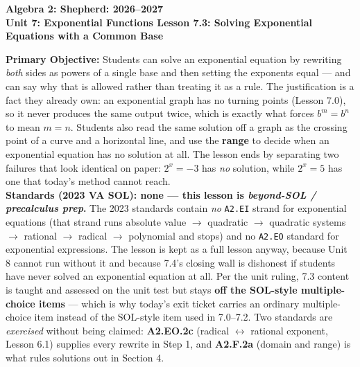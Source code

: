 \documentclass[10pt]{article}
\newcommand{\CourseName}{Algebra 2: Shepherd}
\newcommand{\SchoolYear}{2026--2027}
\newcommand{\UnitNumberName}{Unit 7: Exponential Functions \quad}
\newcommand{\LessonNumberName}{Lesson 7.3: Solving Exponential Equations with a Common Base}
\begin{document}
\begin{center}
    {\Large\bfseries \CourseName: \SchoolYear \\
    {\small\bfseries \UnitNumberName \LessonNumberName}}
\end{center}

\begin{tcolorbox}[colback=forestbg, colframe=forest, boxrule=0.9pt, arc=2mm,
    left=2mm, right=2mm, top=1.5mm, bottom=1.5mm]
    \textbf{Primary Objective:} Students can solve an exponential equation by rewriting \emph{both}
    sides as powers of a single base and then setting the exponents equal --- and can say why that is
    allowed rather than treating it as a rule. The justification is a fact they already own: an
    exponential graph has no turning points (Lesson 7.0), so it never produces the same output twice,
    which is exactly what forces $b^{m}=b^{n}$ to mean $m=n$. Students also read the same solution off
    a graph as the crossing point of a curve and a horizontal line, and use the \textbf{range} to
    decide when an exponential equation has no solution at all. The lesson ends by separating two
    failures that look identical on paper: $2^{x}=-3$ has \emph{no} solution, while $2^{x}=5$ has one
    that today's method cannot reach.
    \\[2pt]
    \textbf{Standards (2023 VA SOL): none --- this lesson is \textit{beyond-SOL / precalculus prep}.}
    The 2023 standards contain \emph{no} \texttt{A2.EI} strand for exponential equations (that strand
    runs absolute value $\to$ quadratic $\to$ quadratic systems $\to$ rational $\to$ radical $\to$
    polynomial and stops) and no \texttt{A2.EO} standard for exponential expressions. The lesson is
    kept as a full lesson anyway, because Unit 8 cannot run without it and because 7.4's closing wall
    is dishonest if students have never solved an exponential equation at all. Per the unit ruling,
    7.3 content is taught and assessed on the unit test but stays \textbf{off the SOL-style
    multiple-choice items} --- which is why today's exit ticket carries an ordinary multiple-choice
    item instead of the SOL-style item used in 7.0--7.2. Two standards are \emph{exercised} without
    being claimed: \textbf{A2.EO.2c} (radical $\leftrightarrow$ rational exponent, Lesson 6.1) supplies
    every rewrite in Step 1, and \textbf{A2.F.2a} (domain and range) is what rules solutions out in
    Section 4.
\end{tcolorbox}
\end{document}
